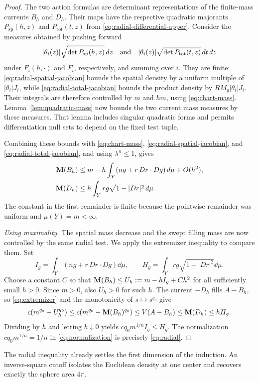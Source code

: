 \begin{proof}
The two action formulas are determinant representations of the
finite-mass currents $B_h$ and $D_h$. Their maps have the respective
quadratic majorants $P_{\mathrm{sp}}(h,z)$ and
$P_{\mathrm{tot}}(t,z)$ from
\eqref{eq:radial-differential-upper}. Consider the measures obtained
by pushing forward
\[
 |\theta_i(z)|\sqrt{\det P_{\mathrm{sp}}(h,z)}\,d z
 \quad\hbox{and}\quad
 |\theta_i(z)|\sqrt{\det P_{\mathrm{tot}}(t,z)}\,d t\,d z
\]
under $F_i(h,\cdot)$ and $F_i$, respectively, and summing over $i$.
They are finite: \eqref{eq:radial-spatial-jacobian} bounds the
spatial density by a uniform multiple of $|\theta_i|J_i$, while
\eqref{eq:radial-total-jacobian} bounds the product density by
$RM_g|\theta_i|J_i$. Their integrals are therefore controlled by
$m$ and $h m$, using \eqref{eq:chart-mass}.
Lemma~\ref{lem:quadratic-mass} now bounds the two current mass
measures by these measures. That lemma includes singular quadratic
forms and permits differentiation null sets to depend on the fixed
test tuple.

Combining these bounds with \eqref{eq:chart-mass},
\eqref{eq:radial-spatial-jacobian}, and
\eqref{eq:radial-total-jacobian}, and using $\lambda^n\leq1$,
gives
\begin{align}
 \mathbf M(B_h)
 &\leq m-h\int_Y(ng+r\,Dr\cdot Dg)\,d\mu+O(h^2),
       \label{eq:radial-spatial-mass}\\
 \mathbf M(D_h)
 &\leq h\int_Y rg\sqrt{1-|Dr|^2}\,d\mu.
       \label{eq:radial-homotopy-mass}
\end{align}
The constant in the first remainder is finite because the
pointwise remainder was uniform and $\mu(Y)=m<\infty$.

\emph{Using maximality.}
The spatial mass decrease and the swept filling mass are now controlled
by the same radial test. We apply the extremizer inequality to compare
them. Set
\[
 I_g=\int_Y(ng+r\,Dr\cdot Dg)\dd\mu,
 \qquad H_g=\int_Y rg\sqrt{1-|Dr|^2}\dd\mu.
\]
Choose a constant $C$ so that
$\mathbf M(B_h)\leq U_h:=m-hI_g+Ch^2$ for all sufficiently small
$h>0$.  Since $m>0$, also $U_h>0$ for such $h$.  The current
$-D_h$ fills $A-B_h$, so \eqref{eq:extremizer} and the
monotonicity of $s\mapsto s^{q_0}$ give
\[
 c(m^{q_0}-U_h^{q_0})
 \leq c(m^{q_0}-\mathbf M(B_h)^{q_0})
 \leq V(A-B_h)\leq\mathbf M(D_h)\leq hH_g.
\]
Dividing by $h$ and letting $h\downarrow0$ yields
$c q_0m^{1/n}I_g\leq H_g$.  The normalization
$c q_0m^{1/n}=1/n$ in \eqref{eq:normalization} is precisely
\eqref{eq:radial}.
\end{proof}

The radial inequality already settles the first dimension of the
induction. An inverse-square cutoff isolates the Euclidean density at
one center and recovers exactly the sphere area $4\pi$.

